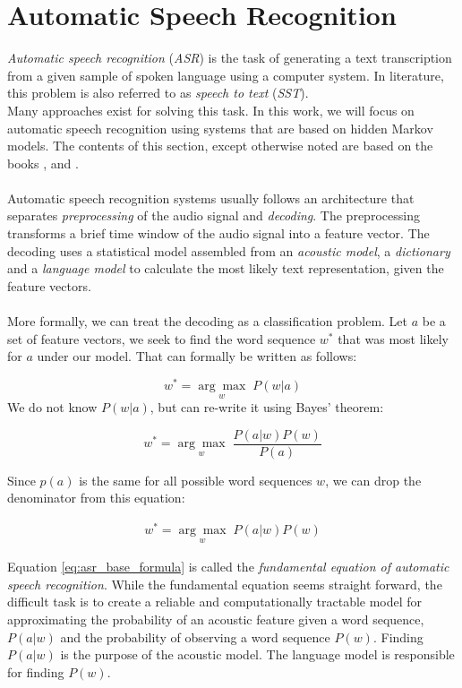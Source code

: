 
\section{Automatic Speech Recognition}
\label{ch:HMM_ASR}
\textit{Automatic speech recognition} (\textit{ASR}) is the task of generating a text transcription from a given sample of spoken language using a computer system. In literature, this problem is also referred to as \textit{speech to text} (\textit{SST}). \\
Many approaches exist for solving this task. In this work, we will focus on automatic speech recognition using systems that are based on hidden Markov models. The contents of this section, except otherwise noted are based on the books \cite{schukat1995automatische}, \cite{huang2001spoken} and \cite{yu2016automatic}. \\ \\
Automatic speech recognition systems usually follows an architecture that separates \textit{preprocessing} of the audio signal and \textit{decoding}. The preprocessing transforms a brief time window of the audio signal into a feature vector. The decoding uses a statistical model assembled from an \textit{acoustic model}, a \textit{dictionary} and a \textit{language model} to calculate the most likely text representation, given the feature vectors.\\ \\

More formally, we can treat the decoding as a classification problem. Let $a$ be a set of feature vectors, we seek to find the word sequence $w^*$ that was most likely for $a$ under our model. That can formally be written as follows:

\[
w^* = \underset{w}{\arg \max} \; P(w|a)
\] 
We do not know $P(w|a)$, but can re-write it using Bayes' theorem:

\[
w^* = \underset{w}{\arg \max} \; \frac{P(a|w) P(w)}{P(a)}
\]

Since $p(a)$ is the same for all possible word sequences $w$, we can drop the denominator from this equation:

\begin{align}
w^* = \underset{w}{\arg \max} \; P(a|w) P(w)
\label{eq:asr_base_formula}
\end{align}

Equation \ref{eq:asr_base_formula} is called the \textit{fundamental equation of automatic speech recognition}. While the fundamental equation seems straight forward, the difficult task is to create a reliable and computationally tractable model for approximating the probability of an acoustic feature given a word sequence, $P(a|w)$ and the probability of observing a word sequence $P(w)$. Finding $P(a|w)$ is the purpose of the acoustic model. The language model is responsible for finding $P(w)$. 

